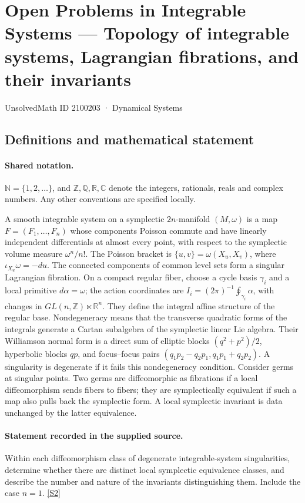 \documentclass[11pt]{article}
\newcommand{\sref}[2]{\hyperlink{source:#1:#2}{[S#2]}}
\begin{document}
\setcounter{section}{2100202}
\section{Open Problems in Integrable Systems — Topology of integrable systems, Lagrangian fibrations, and their invariants}\label{2100203}
{\small\sffamily UnsolvedMath ID 2100203 · Dynamical Systems}
\subsection{Definitions and mathematical statement}

\paragraph{Shared notation.}$\mathbb N=\{1,2,\ldots\}$, and $\mathbb Z,\mathbb Q,\mathbb R,\mathbb C$ denote the integers, rationals, reals and complex numbers. Any other conventions are specified locally.


A smooth integrable system on a symplectic $2n$-manifold $(M,\omega)$ is a map $F=(F_1,\ldots,F_n)$ whose components Poisson commute and have linearly independent differentials at almost every point, with respect to the symplectic volume measure $\omega^n/n!$. The Poisson bracket is $\{u,v\}=\omega(X_u,X_v)$, where $\iota_{X_u}\omega=-du$. The connected components of common level sets form a singular Lagrangian fibration. On a compact regular fiber, choose a cycle basis $\gamma_i$ and a local primitive $d\alpha=\omega$; the action coordinates are $I_i=(2\pi)^{-1}\oint_{\gamma_i}\alpha$, with changes in $GL(n,\mathbb Z)\ltimes\mathbb R^n$. They define the integral affine structure of the regular base. Nondegeneracy means that the transverse quadratic forms of the integrals generate a Cartan subalgebra of the symplectic linear Lie algebra. Their Williamson normal form is a direct sum of elliptic blocks $(q^2+p^2)/2$, hyperbolic blocks $qp$, and focus--focus pairs $(q_1p_2-q_2p_1,q_1p_1+q_2p_2)$. A singularity is degenerate if it fails this nondegeneracy condition. Consider germs at singular points. Two germs are diffeomorphic as fibrations if a local diffeomorphism sends fibers to fibers; they are symplectically equivalent if such a map also pulls back the symplectic form. A local symplectic invariant is data unchanged by the latter equivalence.
\paragraph{Statement recorded in the supplied source.}
Within each diffeomorphism class of degenerate integrable-system singularities, determine whether there are distinct local symplectic equivalence classes, and describe the number and nature of the invariants distinguishing them. Include the case $n=1$. \sref{2100203}{2}
\end{document}
